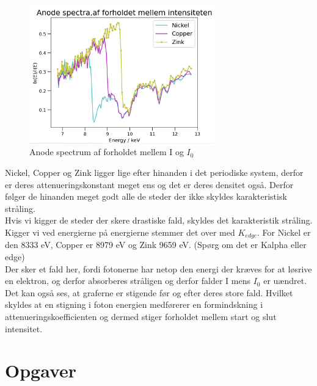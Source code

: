 \documentclass[a4paper,twoside]{article}
\begin{document}
\begin{figure}[H]
\begin{centering}
\includegraphics[height=6cm]{Anode spectra forhold mellem intensiteterne.png}
\hspace{1cm}
\par\end{centering}
\caption{\label{cap:2ien} Anode spectrum af forholdet mellem I og $I_0$ }
\end{figure}
Nickel, Copper og Zink ligger lige efter hinanden i det periodiske system, derfor er deres attenueringskonstant meget ens og det er deres densitet også. Derfor følger de hinanden meget godt alle de steder der ikke skyldes karakteristisk stråling. 
\\ Hvis vi kigger de steder der skere drastiske fald, skyldes det karakteristik stråling. Kigger vi ved energierne på energierne stemmer det over med $K_{edge}$. For Nickel er den 8333 eV, Copper er 8979 eV og Zink 9659 eV. (Spørg om det er Kalpha eller edge) \\
Der sker et fald her, fordi fotonerne har netop den energi der kræves for at løsrive en elektron, og derfor absorberes stråligen og derfor falder I mens $I_0$ er uændret. 
\\
Det kan også ses, at graferne er stigende før og efter deres store fald. Hvilket skyldes at en stigning i foton energien medførerer en formindskning i attenueringskoefficienten og dermed stiger forholdet mellem start og slut intensitet. 


\section{Opgaver}
\end{document}
